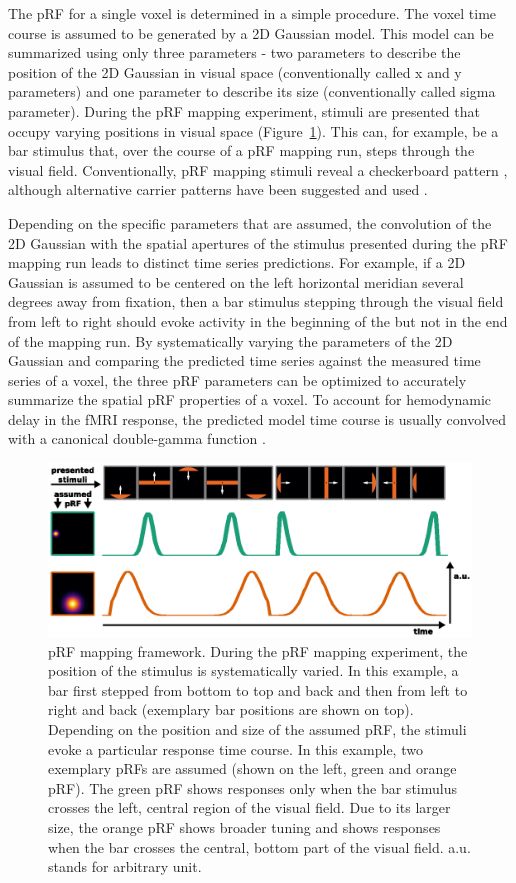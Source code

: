 The pRF for a single voxel is determined in a simple procedure. The voxel time course is assumed to be generated by a 2D Gaussian model. This model can be summarized using only three parameters - two parameters to describe the position of the 2D Gaussian in visual space (conventionally called x and y parameters) and one parameter to describe its size (conventionally called sigma parameter). During the pRF mapping experiment, stimuli are presented that occupy varying positions in visual space (Figure~\ref{fig:prf}). This can, for example, be a bar stimulus that, over the course of a pRF mapping run, steps through the visual field. Conventionally, pRF mapping stimuli reveal a checkerboard pattern \parencite{Dumoulin2008}, although alternative carrier patterns have been suggested and used \parencite{Alvarez2015}.

Depending on the specific parameters that are assumed, the convolution of the 2D Gaussian with the spatial apertures of the stimulus presented during the pRF mapping run leads to distinct time series predictions. For example, if a 2D Gaussian is assumed to be centered on the left horizontal meridian several degrees away from fixation, then a bar stimulus stepping through the visual field from left to right should evoke activity in the beginning of the but not in the end of the mapping run. By systematically varying the parameters of the 2D Gaussian and comparing the predicted time series against the measured time series of a voxel, the three pRF parameters can be optimized to accurately summarize the spatial pRF properties of a voxel. To account for hemodynamic delay in the fMRI response, the predicted model time course is usually convolved with a canonical double-gamma function \parencite{Friston1998}.

\begin{figure}[!htb]
\centering
\includegraphics[width=\textwidth]{figures/chapter_01/fig2.eps}
\caption{pRF mapping framework. During the pRF mapping experiment, the position of the stimulus is systematically varied. In this example, a bar first stepped from bottom to top and back and then from left to right and back (exemplary bar positions are shown on top). Depending on the position and size of the assumed pRF, the stimuli evoke a particular response time course. In this example, two exemplary pRFs are assumed (shown on the left, green and orange pRF). The green pRF shows responses only when the bar stimulus crosses the left, central region of the visual field. Due to its larger size, the orange pRF shows broader tuning and shows responses when the bar crosses the central, bottom part of the visual field. a.u. stands for arbitrary unit.}
\label{fig:prf} 
\end{figure}

